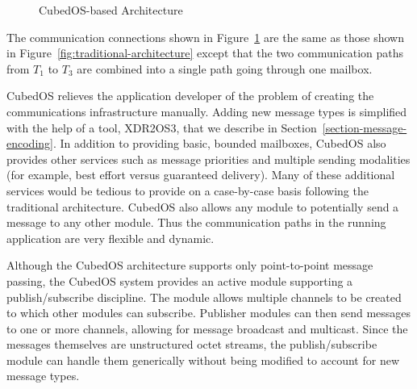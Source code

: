 \begin{figure}[tbhp]
  \center
  \caption{CubedOS-based Architecture}
  \label{fig:cubedos-architecture}
\end{figure}

The communication connections shown in Figure~\ref{fig:cubedos-architecture} are the same as
those shown in Figure~\ref{fig:traditional-architecture} except that the two communication paths
from $T_1$ to $T_3$ are combined into a single path going through one mailbox.

CubedOS relieves the application developer of the problem of creating the communications
infrastructure manually. Adding new message types is simplified with the help of a tool,
XDR2OS3, that we describe in Section~\ref{section-message-encoding}. In addition to providing
basic, bounded mailboxes, CubedOS also provides other services such as message priorities and
multiple sending modalities (for example, best effort versus guaranteed delivery). Many of these
additional services would be tedious to provide on a case-by-case basis following the
traditional architecture. CubedOS also allows any module to potentially send a message to any
other module. Thus the communication paths in the running application are very flexible and
dynamic.

Although the CubedOS architecture supports only point-to-point message passing, the CubedOS
system provides an active module supporting a publish/subscribe discipline. The module allows
multiple channels to be created to which other modules can subscribe. Publisher modules can then
send messages to one or more channels, allowing for message broadcast and multicast. Since the
messages themselves are unstructured octet streams, the publish/subscribe module can handle them
generically without being modified to account for new message types.

